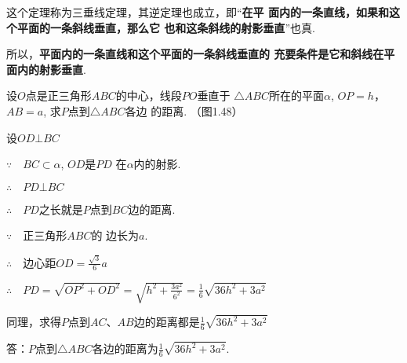 这个定理称为三垂线定理，其逆定理也成立，即“\textbf{在平
面内的一条直线，如果和这个平面的一条斜线垂直，那么它
也和这条斜线的射影垂直}”也真. 

所以，\textbf{平面内的一条直线和这个平面的一条斜线垂直的
充要条件是它和斜线在平面内的射影垂直}. 


\begin{example}
  设$O$点是正三角形$ABC$的中心，线段$PO$垂直于
$\triangle ABC$所在的平面$\alpha$, $OP=h$，$AB=a$, 求$P$点到$\triangle ABC$各边
的距离. （图1.48）
\end{example}

\begin{figure}[htp]
  \centering
{}  
  \caption{}
\end{figure}

\begin{solution}
设$OD\bot BC$

$\because\quad BC\subset \alpha$, $OD$是$PD$
在$\alpha$内的射影. 

$\therefore\quad PD\bot BC$

$\therefore\quad PD$之长就是$P$点到$BC$边的距离. 

$\because\quad $正三角形$ABC$的
边长为$a$.

$\therefore\quad $边心距$OD=\frac{\sqrt{3}}{6}a$

$\therefore\quad PD=\sqrt{OP^2+OD^2}=\sqrt{h^2+\frac{3a^2}{6^2}}=\frac{1}{6}\sqrt{36h^2+3a^2}$

同理，求得$P$点到$AC$、$AB$边的距离都是$\frac{1}{6}\sqrt{36h^2+3a^2}$

答：$P$点到$\triangle ABC$各边的距离为$\frac{1}{6}\sqrt{36h^2+3a^2}$.
\end{solution}



